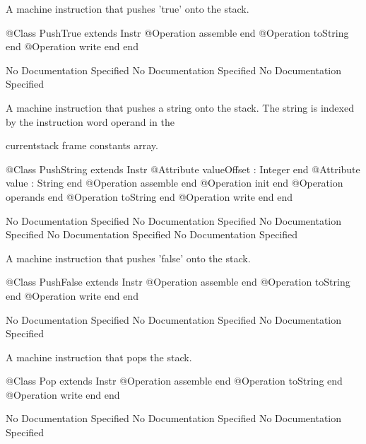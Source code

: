       A machine instruction that pushes 'true' onto the stack.
\begin{Interface}
@Class PushTrue extends Instr
  @Operation assemble end
  @Operation toString end
  @Operation write end
end
\end{Interface}
No Documentation Specified
No Documentation Specified
No Documentation Specified

      A machine instruction that pushes a string onto the stack.
      The string is indexed by the instruction word operand in the

      currentstack frame constants array.
\begin{Interface}
@Class PushString extends Instr
  @Attribute valueOffset : Integer end
  @Attribute value : String end
  @Operation assemble end
  @Operation init end
  @Operation operands end
  @Operation toString end
  @Operation write end
end
\end{Interface}
No Documentation Specified
No Documentation Specified
No Documentation Specified
No Documentation Specified
No Documentation Specified

      A machine instruction that pushes 'false' onto the stack.
\begin{Interface}
@Class PushFalse extends Instr
  @Operation assemble end
  @Operation toString end
  @Operation write end
end
\end{Interface}
No Documentation Specified
No Documentation Specified
No Documentation Specified

      A machine instruction that pops the stack.
\begin{Interface}
@Class Pop extends Instr
  @Operation assemble end
  @Operation toString end
  @Operation write end
end
\end{Interface}
No Documentation Specified
No Documentation Specified
No Documentation Specified


